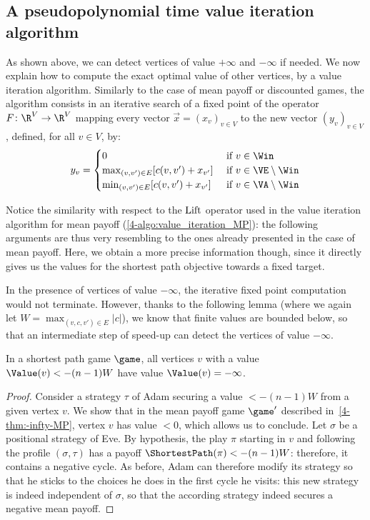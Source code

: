 \subsection*{A pseudopolynomial time value iteration algorithm}
As shown above, we can detect vertices of value $+\infty$ and
$-\infty$ if needed. We now explain how to compute the exact optimal
value of other vertices, by a value iteration algorithm. Similarly to
the case of mean payoff or discounted games, the algorithm consists in
an iterative search of a fixed point of the operator
$F\colon \R^V\to \R^V$ mapping every vector $\vec x=(x_v)_{v\in V}$ to
the new vector $(y_v)_{v\in V}$, defined, for all $v\in V$, by:
\[y_v =
  \begin{cases}
    0 & \text{ if } v\in \Win\\
    \max_{(v,v')\in E} [c(v,v') + x_{v'}] &
    \text{ if } v\in \VE\setminus \Win\\
    \min_{(v,v')\in E} [c(v,v') + x_{v'}] & \text{ if } v\in
    \VA\setminus \Win
  \end{cases}\]

Notice the similarity with respect to the $\textrm{Lift}$ operator used in the
value iteration algorithm for mean payoff
(\cref{4-algo:value_iteration_MP}): the following arguments are thus
very resembling to the ones already presented in the case of
mean payoff. Here, we obtain a more precise information though, since
it directly gives us the values for the shortest path objective
towards a fixed target.

In the presence of vertices of value $-\infty$, the iterative fixed
point computation would not terminate. However, thanks to the
following lemma (where we again let $W=\max_{(v,c,v')\in E} |c|$), we
know that finite values are bounded below, so that an intermediate
step of speed-up can detect the vertices of value $-\infty$.

\begin{lemma}\label{4-lem:-infty}
  In a shortest path game $\game$, all vertices $v$ with a value
  $\Value(v)<-(n-1) W$ have value $\Value(v)=-\infty$.
\end{lemma}
\begin{proof}
  Consider a strategy $\tau$ of Adam securing a value $<-(n-1) W$
  from a given vertex $v$. We show that in the mean payoff game
  $\game'$ described in~\cref{4-thm:-infty-MP}, vertex $v$ has value
  $<0$, which allows us to conclude. Let $\sigma$ be a positional
  strategy of Eve. By hypothesis, the play $\pi$ starting in $v$ and
  following the profile $(\sigma,\tau)$ has a payoff
  $\ShortestPath(\pi)<-(n-1) W$: therefore, it contains a negative
  cycle. As before, Adam can therefore modify its strategy so that he
  sticks to the choices he does in the first cycle he visits: this new
  strategy is indeed independent of $\sigma$, so that the according
  strategy indeed secures a negative mean payoff.
\end{proof}


